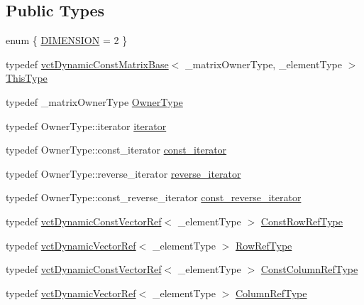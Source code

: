 \subsection*{Public Types}
\begin{DoxyCompactItemize}
\item 
enum \{ \hyperlink{classvct_dynamic_const_matrix_base_ad4b10a99ce01d58a9d7049bf0f28ee95a7101e5e87be1df37bf896f120fa37d10}{D\+I\+M\+E\+N\+S\+I\+O\+N} = 2
 \}
\item 
typedef \hyperlink{classvct_dynamic_const_matrix_base}{vct\+Dynamic\+Const\+Matrix\+Base}$<$ \+\_\+matrix\+Owner\+Type, \+\_\+element\+Type $>$ \hyperlink{classvct_dynamic_const_matrix_base_ac4ff48cbe4d9de3fdef5a02447ffb9db}{This\+Type}
\item 
typedef \+\_\+matrix\+Owner\+Type \hyperlink{classvct_dynamic_const_matrix_base_a2e37ebc2ac741d4346d21f986e625e96}{Owner\+Type}
\item 
typedef Owner\+Type\+::iterator \hyperlink{classvct_dynamic_const_matrix_base_aee4b4524b7972fd1b324cba62505a949}{iterator}
\item 
typedef Owner\+Type\+::const\+\_\+iterator \hyperlink{classvct_dynamic_const_matrix_base_a665b16a8ecd8b6febb4d193efa42205e}{const\+\_\+iterator}
\item 
typedef Owner\+Type\+::reverse\+\_\+iterator \hyperlink{classvct_dynamic_const_matrix_base_a53905f35527b9ce433c246ab50a6b812}{reverse\+\_\+iterator}
\item 
typedef Owner\+Type\+::const\+\_\+reverse\+\_\+iterator \hyperlink{classvct_dynamic_const_matrix_base_afc30420e745eed5f1c838a01088ddc84}{const\+\_\+reverse\+\_\+iterator}
\item 
typedef \hyperlink{classvct_dynamic_const_vector_ref}{vct\+Dynamic\+Const\+Vector\+Ref}$<$ \+\_\+element\+Type $>$ \hyperlink{classvct_dynamic_const_matrix_base_a42a300cb1afd5f0602ba5c2d7d9cc40b}{Const\+Row\+Ref\+Type}
\item 
typedef \hyperlink{classvct_dynamic_vector_ref}{vct\+Dynamic\+Vector\+Ref}$<$ \+\_\+element\+Type $>$ \hyperlink{classvct_dynamic_const_matrix_base_a15b845e745a76559d730ecef10a991b7}{Row\+Ref\+Type}
\item 
typedef \hyperlink{classvct_dynamic_const_vector_ref}{vct\+Dynamic\+Const\+Vector\+Ref}$<$ \+\_\+element\+Type $>$ \hyperlink{classvct_dynamic_const_matrix_base_ac8caf37f979246b1ae99d6e6876879e0}{Const\+Column\+Ref\+Type}
\item 
typedef \hyperlink{classvct_dynamic_vector_ref}{vct\+Dynamic\+Vector\+Ref}$<$ \+\_\+element\+Type $>$ \hyperlink{classvct_dynamic_const_matrix_base_a232026578d12a51aa5228dee998b5663}{Column\+Ref\+Type}

\end{DoxyCompactItemize}
